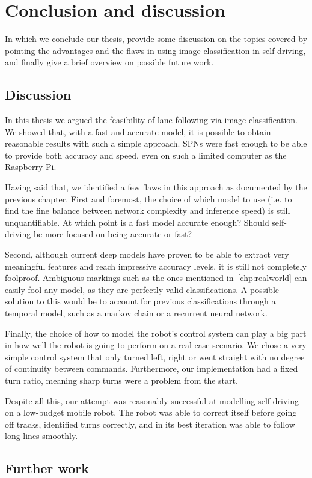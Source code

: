 
\chapter{Conclusion and discussion}\label{chp:conclusions}

In which we conclude our thesis, provide some discussion on the topics covered by pointing the
advantages and the flaws in using image classification in self-driving, and finally give a brief
overview on possible future work.

\section{Discussion}

In this thesis we argued the feasibility of lane following via image classification. We showed
that, with a fast and accurate model, it is possible to obtain reasonable results with such a
simple approach. SPNs were fast enough to be able to provide both accuracy and speed, even on such
a limited computer as the Raspberry Pi.

Having said that, we identified a few flaws in this approach as documented by the previous chapter.
First and foremost, the choice of which model to use (i.e. to find the fine balance between network
complexity and inference speed) is still unquantifiable. At which point is a fast model accurate
enough? Should self-driving be more focused on being accurate or fast?

Second, although current deep models have proven to be able to extract very meaningful features and
reach impressive accuracy levels, it is still not completely foolproof. Ambiguous markings such as
the ones mentioned in~\autoref{chp:realworld} can easily fool any model, as they are perfectly
valid classifications. A possible solution to this would be to account for previous classifications
through a temporal model, such as a markov chain or a recurrent neural network.

Finally, the choice of how to model the robot's control system can play a big part in how well the
robot is going to perform on a real case scenario. We chose a very simple control system that only
turned left, right or went straight with no degree of continuity between commands. Furthermore, our
implementation had a fixed turn ratio, meaning sharp turns were a problem from the start.

Despite all this, our attempt was reasonably successful at modelling self-driving on a low-budget
mobile robot. The robot was able to correct itself before going off tracks, identified turns
correctly, and in its best iteration was able to follow long lines smoothly.

\section{Further work}
